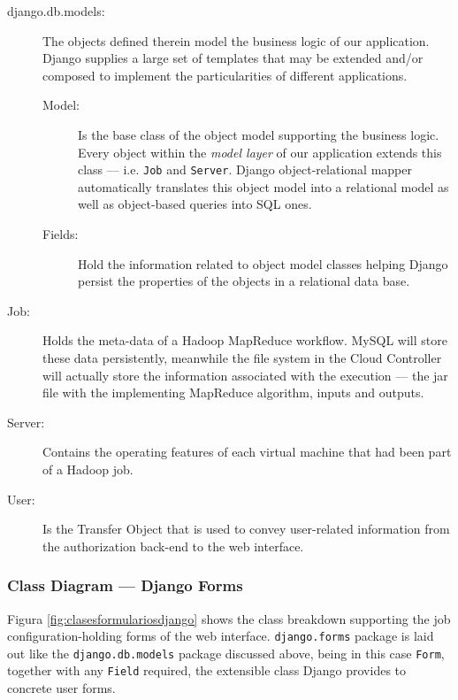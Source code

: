 \begin{description}
 \item[django.db.models:] The objects defined therein model the business logic of our application. Django supplies a large set of templates that may be extended and/or composed to implement the particularities of different applications.
  \begin{description}
   \item[Model:] Is the base class of the object model supporting the business logic. Every object within the \emph{model layer} of our application extends this class --- i.e. \texttt{Job} and \texttt{Server}. Django object-relational mapper automatically translates this object model into a relational model as well as object-based queries into SQL ones.
   \item[Fields:] Hold the information related to object model classes helping Django persist the properties of the objects in a relational data base.
  \end{description}
 \item[Job:] Holds the meta-data of a Hadoop MapReduce workflow. MySQL will store these data persistently, meanwhile the file system in the Cloud Controller will actually store the information associated with the execution --- the jar file with the implementing MapReduce algorithm, inputs and outputs.
 \item[Server:] Contains the operating features of each virtual machine that had been part of a Hadoop job.
 \item[User:] Is the {Transfer Object} that is used to convey user-related information from the authorization back-end to the web interface.
\end{description}

\subsubsection{Class Diagram --- Django Forms}\label{subsubsec:clasesformulariosdjango}
\noindent Figura \ref{fig:clasesformulariosdjango} shows the class breakdown supporting the job configuration-holding forms of the web interface. \texttt{django.forms} package is laid out like the \texttt{django.db.models} package discussed above, being in this case \texttt{Form}, together with any \texttt{Field} required, the extensible class Django provides to concrete user forms.


